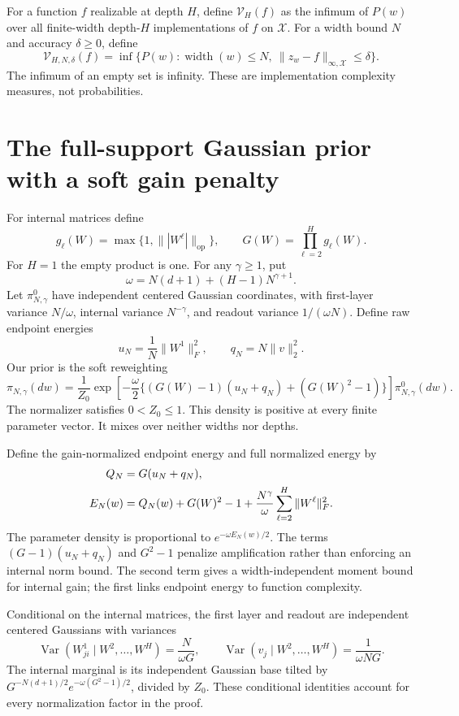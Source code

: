 \documentclass[11pt]{article}
\theoremstyle{definition}\newtheorem{definition}[theorem]{Definition}
\theoremstyle{remark}\newtheorem{remark}[theorem]{Remark}
\newcommand{\op}{\mathrm{op}}\newcommand{\VarPath}{\mathcal V}
\begin{document}
For a function $f$ realizable at depth $H$, define $\VarPath_H(f)$ as the infimum of $P(w)$ over all finite-width depth-$H$ implementations of $f$ on $\mathcal X$. For a width bound $N$ and accuracy $\delta\ge0$, define
\begin{equation}
 \VarPath_{H,N,\delta}(f)=
 \inf\{P(w):\operatorname{width}(w)\le N,\ \|z_w-f\|_{\infty,\mathcal X}\le\delta\}.
 \label{eq:approx-variation}
\end{equation}
The infimum of an empty set is infinity. These are implementation complexity measures, not probabilities.

\section{The full-support Gaussian prior with a soft gain penalty}
For internal matrices define
\[
 g_\ell(W)=\max\{1,\||W^\ell|\|_{\op}\},\qquad
 G(W)=\prod_{\ell=2}^H g_\ell(W).
\]
For $H=1$ the empty product is one. For any $\gamma\ge1$, put
\[
 \omega=N(d+1)+(H-1)N^{\gamma+1}.
\]
Let $\pi^0_{N,\gamma}$ have independent centered Gaussian coordinates, with first-layer variance $N/\omega$, internal variance $N^{-\gamma}$, and readout variance $1/(\omega N)$. Define raw endpoint energies
\[
 u_N=\frac1N\|W^1\|_F^2,\qquad q_N=N\|v\|_2^2.
\]
Our prior is the soft reweighting
\begin{equation}
 \pi_{N,\gamma}(dw)=\frac1{Z_0}
 \exp\left[-\frac\omega2\bigl\{(G(W)-1)(u_N+q_N)+(G(W)^2-1)\bigr\}\right]\pi^0_{N,\gamma}(dw).
 \label{eq:prior}
\end{equation}
The normalizer satisfies $0<Z_0\le1$. This density is positive at every finite parameter vector. It mixes over neither widths nor depths.

Define the gain-normalized endpoint energy and full normalized energy by
\begin{align}
 Q_N&=G(u_N+q_N),\notag\\
 E_N(w)&=Q_N(w)+G(W)^2-1+\frac{N^\gamma}{\omega}\sum_{\ell=2}^H\|W^\ell\|_F^2.
 \label{eq:energy}
\end{align}
The parameter density is proportional to $e^{-\omega E_N(w)/2}$. The terms $(G-1)(u_N+q_N)$ and $G^2-1$ penalize amplification rather than enforcing an internal norm bound. The second term gives a width-independent moment bound for internal gain; the first links endpoint energy to function complexity.

Conditional on the internal matrices, the first layer and readout are independent centered Gaussians with variances
\begin{equation}
 \operatorname{Var}(W^1_{ji}\mid W^2,\ldots,W^H)=\frac{N}{\omega G},\qquad
 \operatorname{Var}(v_j\mid W^2,\ldots,W^H)=\frac1{\omega NG}.
 \label{eq:conditional-prior}
\end{equation}
The internal marginal is its independent Gaussian base tilted by $G^{-N(d+1)/2}e^{-\omega(G^2-1)/2}$, divided by $Z_0$. These conditional identities account for every normalization factor in the proof.
\end{document}
